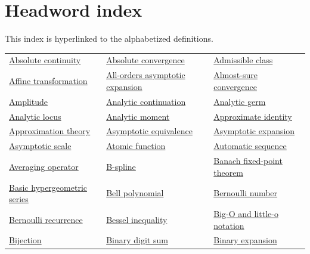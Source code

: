 \documentclass[11pt,oneside]{article}
\begin{document}
\section*{Headword index}
\small This index is hyperlinked to the alphabetized definitions.\normalsize\par\medskip
\begingroup\small\setlength{\tabcolsep}{5pt}\renewcommand{\arraystretch}{1.15}
\begin{longtable}{p{}p{}p{}}
\hyperlink{gls:absolute-continuity}{Absolute continuity} & \hyperlink{gls:absolute-convergence}{Absolute convergence} & \hyperlink{gls:admissible-class}{Admissible class} \\
\hyperlink{gls:affine-transformation}{Affine transformation} & \hyperlink{gls:all-orders-asymptotic-expansion}{All-orders asymptotic expansion} & \hyperlink{gls:almost-sure-convergence}{Almost-sure convergence} \\
\hyperlink{gls:amplitude}{Amplitude} & \hyperlink{gls:analytic-continuation}{Analytic continuation} & \hyperlink{gls:analytic-germ}{Analytic germ} \\
\hyperlink{gls:analytic-locus}{Analytic locus} & \hyperlink{gls:analytic-moment}{Analytic moment} & \hyperlink{gls:approximate-identity}{Approximate identity} \\
\hyperlink{gls:approximation-theory}{Approximation theory} & \hyperlink{gls:asymptotic-equivalence}{Asymptotic equivalence} & \hyperlink{gls:asymptotic-expansion}{Asymptotic expansion} \\
\hyperlink{gls:asymptotic-scale}{Asymptotic scale} & \hyperlink{gls:atomic-function}{Atomic function} & \hyperlink{gls:automatic-sequence}{Automatic sequence} \\
\hyperlink{gls:averaging-operator}{Averaging operator} & \hyperlink{gls:b-spline}{B-spline} & \hyperlink{gls:banach-fixed-point-theorem}{Banach fixed-point theorem} \\
\hyperlink{gls:basic-hypergeometric-series}{Basic hypergeometric series} & \hyperlink{gls:bell-polynomial}{Bell polynomial} & \hyperlink{gls:bernoulli-number}{Bernoulli number} \\
\hyperlink{gls:bernoulli-recurrence}{Bernoulli recurrence} & \hyperlink{gls:bessel-inequality}{Bessel inequality} & \hyperlink{gls:big-o-and-little-o}{Big-O and little-o notation} \\
\hyperlink{gls:bijection}{Bijection} & \hyperlink{gls:binary-digit-sum}{Binary digit sum} & \hyperlink{gls:binary-expansion}{Binary expansion} \\

\end{longtable}
\end{document}
